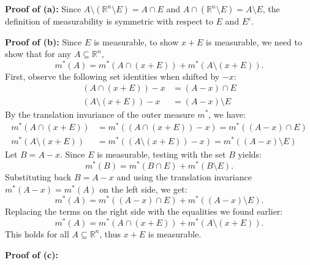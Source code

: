 \begin{pfbox}
    \textbf{Proof of (a):} Since $A \setminus (\mathbb{R}^n \setminus E) = A \cap E$ and $A \cap (\mathbb{R}^n \setminus E) = A \setminus E$, the definition of measurability is symmetric with respect to $E$ and $E^c$.

    \textbf{Proof of (b):} Since $E$ is measurable, to show $x+E$ is measurable, we need to show that for any $A \subseteq \mathbb{R}^n$,
    \[ m^*(A) = m^*(A \cap (x+E)) + m^*(A \setminus (x+E)). \]
    First, observe the following set identities when shifted by $-x$:
    \begin{align*}
        (A \cap (x+E)) - x &= (A - x) \cap E \\
        (A \setminus (x+E)) - x &= (A - x) \setminus E
    \end{align*}
    By the translation invariance of the outer measure $m^*$, we have:
    \begin{align*}
        m^*(A \cap (x+E)) &= m^*((A \cap (x+E)) - x) = m^*((A - x) \cap E) \\
        m^*(A \setminus (x+E)) &= m^*((A \setminus (x+E)) - x) = m^*((A - x) \setminus E)
    \end{align*}
    Let $B = A - x$. Since $E$ is measurable, testing with the set $B$ yields:
    \[ m^*(B) = m^*(B \cap E) + m^*(B \setminus E). \]
    Substituting back $B = A - x$ and using the translation invariance $m^*(A-x) = m^*(A)$ on the left side, we get:
    \[ m^*(A) = m^*((A - x) \cap E) + m^*((A - x) \setminus E). \]
    Replacing the terms on the right side with the equalities we found earlier:
    \[ m^*(A) = m^*(A \cap (x+E)) + m^*(A \setminus (x+E)). \]
    This holds for all $A \subseteq \mathbb{R}^n$, thus $x+E$ is measurable.

\textbf{Proof of (c):} 


\end{pfbox}
